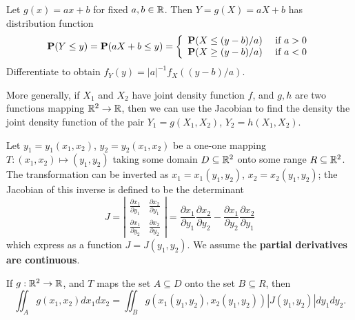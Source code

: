 \begin{example}
Let $g(x) = ax + b$ for fixed $a, b \in \mathbb{R}$. Then $Y = g (X) = aX + b$ has distribution function 
\begin{equation*}
    \mathbf{P}(Y \leq y) = \mathbf{P}(a X+b \leq y) = \left\{\begin{array}{ll}
    {\mathbf{P}(X \leq(y-b) / a)} & {\text { if } a>0} \\
    {\mathbf{P}(X \geq(y-b) / a)} & {\text { if } a<0}\end{array}\right.
\end{equation*}
Differentiate to obtain $f_{Y}(y)=|a|^{-1} f_{X}((y-b) / a)$.
\end{example}

More generally, if $X_1$ and $X_2$ have joint density function $f$, and $g, h$ are two functions mapping $\mathbb{R}^2 \to \mathbb{R}$, then we can use the Jacobian to find the density the joint density function of the pair $Y_1 = g(X_1 , X_2)$, $Y_2 = h(X_1 , X_2)$. 

Let $y_1 = y_1 (x_1 , x_2)$, $y_2 = y_2(x_1 , x_2)$ 
be a one-one mapping $T : (x_1 , x_2) \mapsto (y_1 , y_2)$ taking some domain $D \subseteq \mathbb{R}^2$ onto some 
range $R \subseteq \mathbb{R}^2$. The transformation can be inverted as $x_1 = x_1(y_1 , y_2)$, $x_2 = x_2(y_1 , y_2)$; the Jacobian of this inverse is defined to be the determinant 
\begin{equation*}
    J=\left|\begin{array}{ll}{\frac{\partial x_{1}}{\partial y_{1}}} & {\frac{\partial x_{2}}{\partial y_{1}}} \\ {\frac{\partial x_{1}}{\partial y_{2}}} & {\frac{\partial x_{2}}{\partial y_{2}}}\end{array}\right|=\frac{\partial x_{1}}{\partial y_{1}} \frac{\partial x_{2}}{\partial y_{2}}-\frac{\partial x_{1}}{\partial y_{2}} \frac{\partial x_{2}}{\partial y_{1}}
\end{equation*}
which express as a function $J = J(y_1, y_2)$. We assume the \textbf{partial derivatives are continuous}.

\begin{theorem}
If $g : \mathbb{R}^2 \to \mathbb{R}$, and $T$ maps the set $A \subseteq D$ onto the set $B \subseteq R$, then 
\begin{equation*}
    \iint_{A} g\left(x_{1}, x_{2}\right) d x_{1} d x_{2}=\iint_{B} g\left(x_{1}\left(y_{1}, y_{2}\right), x_{2}\left(y_{1}, y_{2}\right)\right)\left|J\left(y_{1}, y_{2}\right)\right| d y_{1} d y_{2}.
\end{equation*}
\end{theorem}

